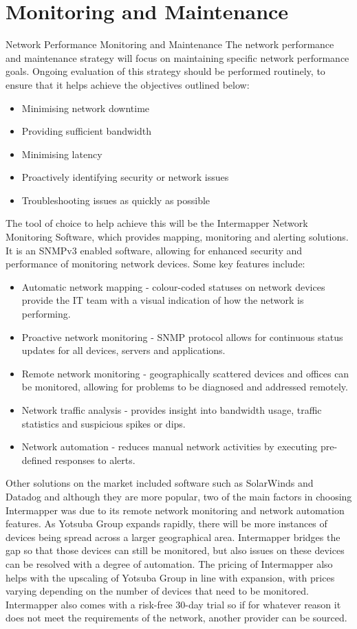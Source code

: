 \chapter{Monitoring and Maintenance}

Network Performance Monitoring and Maintenance
The network performance and maintenance strategy will focus on maintaining specific network performance goals. Ongoing evaluation of this strategy should be performed routinely, to ensure that it helps achieve the objectives outlined below:
\begin{itemize}
    \item Minimising network downtime
    \item Providing sufficient bandwidth
    \item Minimising latency
    \item Proactively identifying security or network issues
    \item Troubleshooting issues as quickly as possible
\end{itemize}

The tool of choice to help achieve this will be the Intermapper Network Monitoring Software, which provides mapping, monitoring and alerting solutions. It is an SNMPv3 enabled software, allowing for enhanced security and performance of monitoring network devices. Some key features include:
\begin{itemize}
    \item Automatic network mapping - colour-coded statuses on network devices provide the IT team with a visual indication of how the network is performing.
    \item Proactive network monitoring - SNMP protocol allows for continuous status updates for all devices, servers and applications.
    \item Remote network monitoring - geographically scattered devices and offices can be monitored, allowing for problems to be diagnosed and addressed remotely.
    \item Network traffic analysis - provides insight into bandwidth usage, traffic statistics and suspicious spikes or dips.
    \item Network automation - reduces manual network activities by executing pre-defined responses to alerts.
\end{itemize}

Other solutions on the market included software such as SolarWinds and Datadog and although they are more popular, two of the main factors in choosing Intermapper was due to its remote network monitoring and network automation features. As Yotsuba Group expands rapidly, there will be more instances of devices being spread across a larger geographical area. Intermapper bridges the gap so that those devices can still be monitored, but also issues on these devices can be resolved with a degree of automation.
The pricing of Intermapper also helps with the upscaling of Yotsuba Group in line with expansion, with prices varying depending on the number of devices that need to be monitored. Intermapper also comes with a risk-free 30-day trial so if for whatever reason it does not meet the requirements of the network, another provider can be sourced.